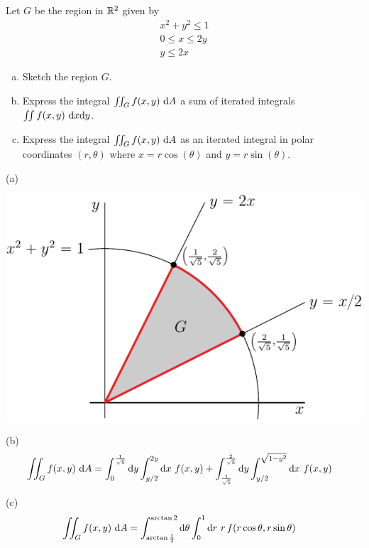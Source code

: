 \subsection*{\Application}
\begin{question}[M200 2010A] %
Let $G$ be the region in $\mathbb{R}^2$ given by
\begin{gather*}
x^2 + y^2 \le 1 \\
0 \le x \le 2y \\
y \le 2x
\end{gather*}
\begin{enumerate}[(a)]
\item
Sketch the region $G$.
\item
Express the integral $\dblInt_G f(x,y)\ \dee{A}$ 
a sum of iterated integrals $\iint f(x, y)\ \mathrm{d}x\mathrm{d}y$.
\item
Express the integral $\dblInt_G f(x,y)\ \dee{A}$ 
as an iterated integral in polar coordinates $(r, \theta)$ where $x = r \cos(\theta)$ and 
$y = r \sin(\theta)$.
\end{enumerate}
\end{question}

%

\begin{answer}
(a)
\begin{center}
     \includegraphics{fig/OE10A_5.pdf}
\end{center}

(b)
\begin{align*}
\iint_G f(x,y)\ \mathrm{d}A
&=\int_0^{\frac{1}{\sqrt{5}}}\mathrm{d}y\int_{y/2}^{2y}\mathrm{d}x\ f(x,y)
 +\int_{\frac{1}{\sqrt{5}}}^{\frac{2}{\sqrt{5}}}\mathrm{d}y\int_{y/2}^{\sqrt{1-y^2}}
         \mathrm{d}x\ f(x,y)
\end{align*}

(c)
\begin{align*}
\iint_G f(x,y)\ \mathrm{d}A
&=\int_{\arctan\frac{1}{2}}^{\arctan 2}\mathrm{d}\theta
       \int_0^1\mathrm{d}r\ r\,f(r\cos\theta,r\sin\theta)
\end{align*}
\end{answer}

